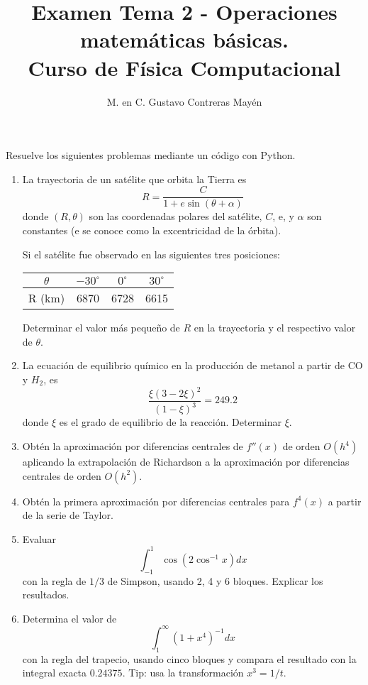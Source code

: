 \documentclass[11pt]{article}
\title{Examen Tema 2 - Operaciones matem\'{a}ticas b\'{a}sicas. \\ Curso de Física Computacional}
\author{M. en C. Gustavo Contreras May\'{e}n}
\date{ }
\begin{document}
\maketitle
\fontsize{14}{14}\selectfont
Resuelve los siguientes problemas mediante un c\'{o}digo con Python.
\begin{enumerate}
\item La trayectoria de un sat\'{e}lite que orbita la Tierra es
\[ R = \dfrac{C}{1 + e \sin(\theta + \alpha)}\]
donde $(R,\theta)$ son las coordenadas polares del sat\'{e}lite, $C$, e, y $\alpha$ son constantes (e se conoce como la excentricidad de la \'{o}rbita).
\begin{center}
\end{center}
Si el sat\'{e}lite fue observado en las siguientes tres posiciones:
\\
\begin{center}
\begin{tabular}{c | c | c | c}
$\theta$ & $-30^{\circ}$ & $0^{\circ}$ & $30^{\circ}$ \\ \hline
R (km) & 6870 & 6728 & 6615
\end{tabular}
\end{center}
Determinar el valor m\'{a}s pequeño de $R$ en la trayectoria y el respectivo valor de $\theta$.
\item La ecuaci\'{o}n de equilibrio qu\'{i}mico en la producci\'{o}n de metanol a partir de CO y $H_{2}$, es
\[ \dfrac{\xi (3-2 \xi)^{2}}{(1-\xi)^{3}} = 249.2\]
donde $\xi$ es el grado de equilibrio de la reacción. Determinar $\xi$.
\item Obt\'{e}n la aproximaci\'{o}n por diferencias centrales de $f''(x)$ de orden $O(h^{4})$ aplicando la extrapolaci\'{o}n de Richardson a la aproximaci\'{o}n por diferencias centrales de orden $O(h^{2})$.
\item Obt\'{e}n la primera aproximaci\'{o}n por diferencias centrales para $f^{4}(x)$ a partir de la serie de Taylor.
\item Evaluar
\[ \int_{-1}^{1} \cos(2 \cos^{-1} x) dx\]
con la regla de $1/3$ de Simpson, usando 2, 4 y 6 bloques. Explicar los resultados.
\item Determina el valor de 
\[ \int_{1}^{\infty} (1+x^{4})^{-1} dx\]
con la regla del trapecio, usando cinco bloques y compara el resultado con la integral exacta $0.24375$. Tip: usa la transformaci\'{o}n $x^{3}= 1/t$.

\end{enumerate}
\end{document}
